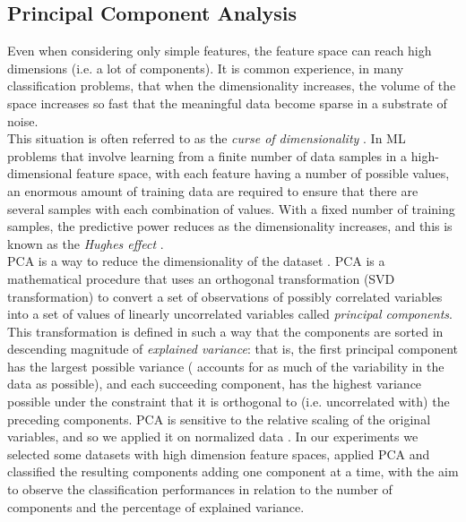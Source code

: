\vspace{0.5cm}


\subsection{Principal Component Analysis}

Even when considering only simple features, the feature space can reach high dimensions (i.e. a lot of components). It is common experience,
in many classification problems, that when the dimensionality increases, the volume of the space increases so fast that the meaningful data become sparse
in a substrate of noise.\\
This situation is often referred to as the \textit{curse of dimensionality} \cite{bellmandynamic}.
In \Gls{ML} problems that involve learning from a finite number of data samples in a high-dimensional feature space,
with each feature having a number of possible values, an enormous amount of training data are required to ensure that there are several samples with each combination of values.
With a fixed number of training samples, the predictive power reduces as the dimensionality increases, and this is known as the \textit{Hughes effect} \cite{hughes}.\\
\Gls{PCA} is a way to reduce the dimensionality of the dataset \cite{PCA_jolliffe}. \Gls{PCA} is a mathematical procedure that uses an orthogonal transformation
(SVD transformation) to convert a set of observations of possibly correlated variables into a set of values of linearly uncorrelated variables called \textit{principal components}.
This transformation is defined in such a way that the components are sorted in descending magnitude of \textit{explained variance}: that is, the first principal component
has the largest possible variance ( accounts for as much of the variability in the data as possible), and each succeeding component, has the highest variance possible under the constraint
that it is orthogonal to (i.e. uncorrelated with) the preceding components. \Gls{PCA} is sensitive to the relative scaling of the original variables, 
and so we applied it on normalized data \cite{PCA02_applications}.
In our experiments we selected some datasets with high dimension feature spaces, applied \Gls{PCA} and classified the resulting components adding one component at a time, with the aim to
observe the classification performances in relation to the number of components and the percentage of explained variance.


\vspace{0.5cm}


